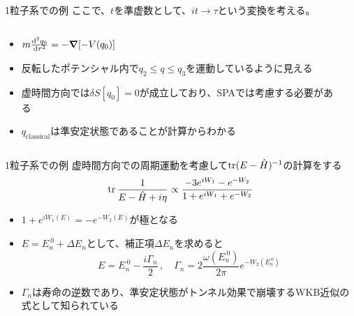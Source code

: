 \documentclass[14pt,aspectratio=169,xcolor=dvipsnames,table,dvipdfmx]{beamer}
\theoremstyle{definition}
\begin{document}
\begin{frame}{1粒子系での例}
  ここで、$t$を準虚数として、$it\to\tau$という変換を考える。
  \begin{columns}[t]
    \begin{column}{.5\textwidth}
      \begin{itemize}
        \item $m\dv[2]{q_0}{\tau} = -\grad \qty[-V(q_0)]$
        \item 反転したポテンシャル内で$q_2\leq q\leq q_3$を運動しているように見える
        \item 虚時間方向では$\delta S[q_0]=0$が成立しており、SPAでは考慮する必要がある
        \item $q_{\text{classical}}$は準安定状態であることが計算からわかる
      \end{itemize}
    \end{column}
    \begin{column}{.5\textwidth}
    \end{column}
  \end{columns}
\end{frame}

\begin{frame}{1粒子系での例}
  虚時間方向での周期運動を考慮して$\trace(E-\hat{H})^{-1}$の計算をする
  \begin{equation*}
    \trace\frac{1}{E-\hat{H}+i\eta} \propto \frac{-3e^{iW_1}-e^{-W_2}}{1+e^{iW_1}+e^{-W_2}}
  \end{equation*}
  \begin{itemize}
    \item $1+e^{iW_1(E)}=-e^{-W_2(E)}$が極となる
    \item $E=E_{n}^{~0}+\varDelta E_n$として、補正項$\varDelta E_n$を求めると
          \begin{equation*}
            E = E_{n}^{~0} -\frac{i\Gamma_n}{2}\,,\quad \Gamma_n = 2\frac{\omega(E_n^{~0})}{2\pi}e^{-W_2(E_n^{~0})}
          \end{equation*}
    \item $\Gamma_n$は寿命の逆数であり、準安定状態がトンネル効果で崩壊するWKB近似の式として知られている
  \end{itemize}
\end{frame}
\end{document}
